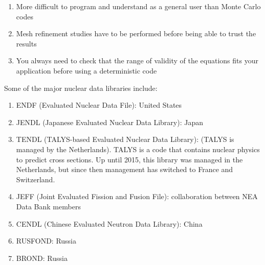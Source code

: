 \documentclass[10pt]{article}
\newcommand*\circled[1]{\tikz[baseline=(char.base)]{
            \node[shape=circle,draw,inner sep=2pt] (char) {#1};}}
\begin{document}
\begin{enumerate}
\item More difficult to program and understand as a general user than Monte Carlo codes
\item Mesh refinement studies have to be performed before being able to trust the results
\item You always need to check that the range of validity of the equations fits your application before using a deterministic code
\end{enumerate}

\circled{4}\newline

\circled{5} Some of the major nuclear data libraries include:

\begin{enumerate}
\item ENDF (Evaluated Nuclear Data File): United States
\item JENDL (Japanese Evaluated Nuclear Data Library): Japan
\item TENDL (TALYS-based Evaluated Nuclear Data Library): (TALYS is managed by the Netherlands). TALYS is a code that contains nuclear physics to predict cross sections. Up until 2015, this library was managed in the Netherlands, but since then management has switched to France and Switzerland.
\item JEFF (Joint Evaluated Fission and Fusion File): collaboration between NEA Data Bank members
\item CENDL (Chinese Evaluated Neutron Data Library): China
\item RUSFOND: Russia
\item BROND: Russia
\end{enumerate}
\end{document}
